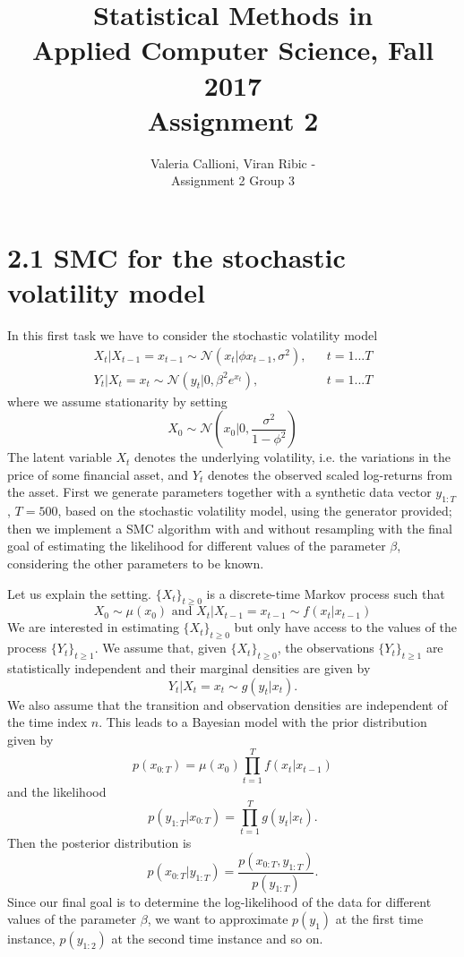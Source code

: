 \documentclass[]{article}
\title{Statistical Methods in \\ Applied Computer Science, Fall 2017 \\ Assignment 2}
\author{Valeria Callioni, Viran Ribic - \\ Assignment 2 Group 3}
\begin{document}
\maketitle

\section*{2.1 SMC for the stochastic volatility model}
In this first task we have to consider the stochastic volatility model
\begin{align*}
	X_t|X_{t-1} = x_{t-1} \sim \mathcal{N}(x_t | \phi x_{t-1},\sigma^2), && t=1...T 
	\\
	Y_t|X_t = x_t \sim \mathcal{N}(y_t | 0, \beta^2e^{x_t}), && t=1...T 
\end{align*}
where we assume stationarity by setting 
$$
X_0 \sim \mathcal{N}(x_0 | 0, \frac{\sigma^2}{1-\phi^2})
$$
The latent variable $X_t$ denotes the underlying volatility, i.e. the variations in the price of some ﬁnancial asset, and $Y_t$ denotes the observed scaled log-returns from the asset. 
First we generate parameters together with a synthetic data vector $y_{1:T}$, $T = 500$, based on the stochastic volatility model, using the generator provided; then we implement a SMC algorithm with and without resampling with the final goal of estimating the likelihood for different values of the parameter $\beta$, considering the other parameters to be known. 

Let us explain the setting. $\{X_t\}_{t\geq0}$ is a discrete-time Markov process such that 
$$
X_0 \sim \mu(x_0) \text{ and } X_t|X_{t-1} = x_{t-1} \sim f(x_t|x_{t-1})
$$
We are interested in estimating $\{X_t\}_{t\geq0}$ but only have access to the values of the process $\{Y_t\}_{t\geq1}$. We assume that, given $\{X_t\}_{t\geq0}$, the observations $\{Y_t\}_{t\geq1}$ are statistically independent and their marginal densities are given by
$$
Y_t|X_t = x_t \sim g(y_t|x_t).
$$
We also assume that the transition and observation densities are independent of the time index $n$. This leads to a Bayesian model with the prior distribution given by 
$$
p(x_{0:T}) = \mu(x_0)\prod_{t=1}^{T}f(x_t|x_{t-1})
$$
and the likelihood
$$
p(y_{1:T}|x_{0:T}) = \prod_{t=1}^{T}g(y_t|x_t).
$$
Then the posterior distribution is
$$
p(x_{0:T}|y_{1:T}) = \frac{p(x_{0:T},y_{1:T})}{p(y_{1:T})}.
$$
Since our final goal is to determine the log-likelihood of the data for different values of the parameter $\beta$, we want to approximate $p(y_1)$ at the first time instance, $p(y_{1:2})$ at the second time instance and so on.
\end{document}
